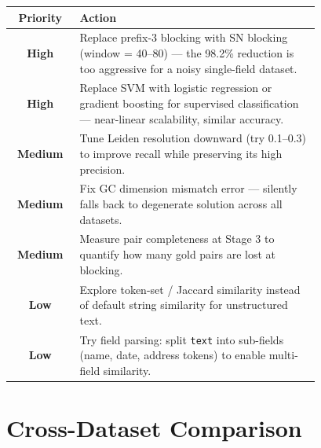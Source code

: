 \documentclass[11pt, a4paper]{article}
\begin{document}
\begin{table}[h!]
\centering
\begin{tabular}{cp{0.78\linewidth}}
\toprule
\textbf{Priority} & \textbf{Action} \\
\midrule
{\color{highprio}\textbf{High}}  & Replace prefix-3 blocking with SN blocking (window = 40--80) --- the 98.2\% reduction is too aggressive for a noisy single-field dataset. \\[4pt]
{\color{highprio}\textbf{High}}  & Replace SVM with logistic regression or gradient boosting for supervised classification --- near-linear scalability, similar accuracy. \\[4pt]
{\color{medprio}\textbf{Medium}} & Tune Leiden resolution downward (try 0.1--0.3) to improve recall while preserving its high precision. \\[4pt]
{\color{medprio}\textbf{Medium}} & Fix GC dimension mismatch error --- silently falls back to degenerate solution across all datasets. \\[4pt]
{\color{medprio}\textbf{Medium}} & Measure pair completeness at Stage 3 to quantify how many gold pairs are lost at blocking. \\[4pt]
{\color{lowprio}\textbf{Low}}    & Explore token-set / Jaccard similarity instead of default string similarity for unstructured text. \\[4pt]
{\color{lowprio}\textbf{Low}}    & Try field parsing: split \texttt{text} into sub-fields (name, date, address tokens) to enable multi-field similarity. \\
\bottomrule
\end{tabular}
\end{table}

\section{Cross-Dataset Comparison}
\end{document}
